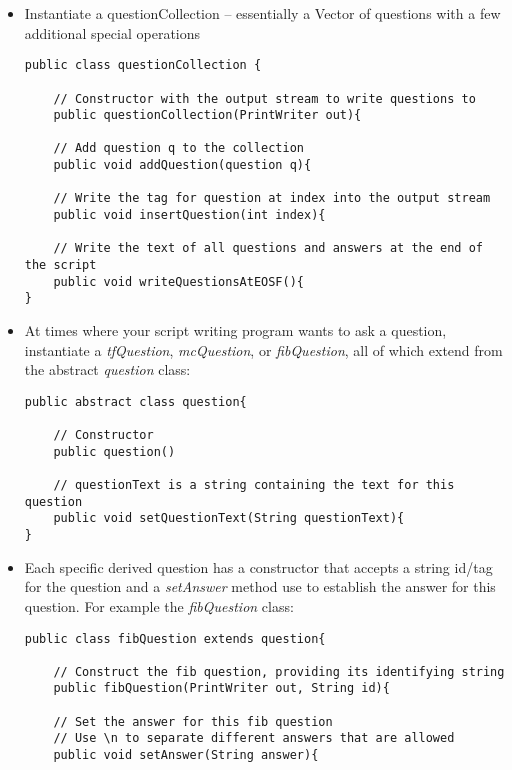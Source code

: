 \documentclass[12pt]{article}
\begin{document}
\begin{itemize}
\item Instantiate a questionCollection -- essentially a Vector of questions with a few additional special operations

\small
\begin{verbatim}
public class questionCollection {
    
    // Constructor with the output stream to write questions to
    public questionCollection(PrintWriter out){

    // Add question q to the collection
    public void addQuestion(question q){

    // Write the tag for question at index into the output stream
    public void insertQuestion(int index){

    // Write the text of all questions and answers at the end of the script
    public void writeQuestionsAtEOSF(){
}
\end{verbatim}

\normalsize  
\item At times where your script writing program wants to ask a
  question, instantiate a \textit{tfQuestion}, \textit{mcQuestion}, or
  \textit{fibQuestion}, all of which extend from the abstract
  \textit{question} class:

\small
\begin{verbatim}
public abstract class question{
    
    // Constructor 
    public question()

    // questionText is a string containing the text for this question
    public void setQuestionText(String questionText){
}
\end{verbatim}
  
\normalsize
\item Each specific derived question has a constructor that accepts a
  string id/tag for the question and a \textit{setAnswer} method use
  to establish the answer for this question.  For example the
  \textit{fibQuestion} class:

\small
\begin{verbatim}
public class fibQuestion extends question{
    
    // Construct the fib question, providing its identifying string
    public fibQuestion(PrintWriter out, String id){

    // Set the answer for this fib question
    // Use \n to separate different answers that are allowed
    public void setAnswer(String answer){


\end{verbatim}
\end{itemize}
\end{document}

